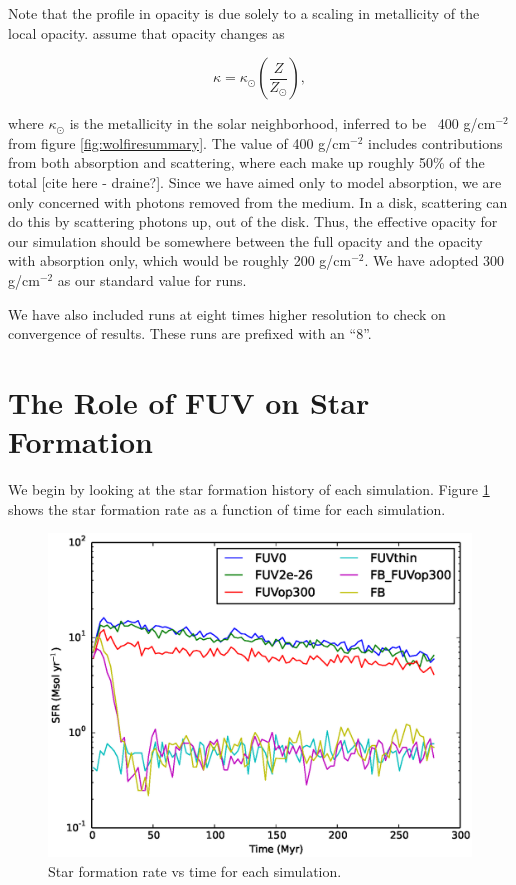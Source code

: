 Note that the profile in opacity is due solely to a scaling in metallicity of the local opacity. \citet{wolfireEt03} assume that opacity changes as

\begin{equation}
\kappa = \kappa_{\odot}\left(\frac{Z}{Z_{\odot}}\right),
\end{equation}

\noindent
where $\kappa_{\odot}$ is the metallicity in the solar neighborhood, inferred to be ~400 g/cm$^{-2}$ from figure \ref{fig:wolfiresummary}. The value of 400 g/cm$^{-2}$ includes contributions from both absorption and scattering, where each make up roughly 50\% of the total [cite here - draine?]. Since we have aimed only to model absorption, we are only concerned with photons removed from the medium. In a disk, scattering can do this by scattering photons up, out of the disk. Thus, the effective opacity for our simulation should be somewhere between the full opacity and the opacity with absorption only, which would be roughly 200 g/cm$^{-2}$. We have adopted 300 g/cm$^{-2}$ as our standard value for runs.

We have also included runs at eight times higher resolution to check on convergence of results. These runs are prefixed with an ``8''.

\section{The Role of FUV on Star Formation}
\label{sec:fuvsfr}

We begin by looking at the star formation history of each simulation. Figure \ref{fig:sfrvtime} shows the star formation rate as a function of time for each simulation. 

\begin{figure}
\includegraphics[width=\textwidth]{graphics/sfrvtime.eps}
\caption[Star formation histories.]{Star formation rate vs time for each simulation.}
\label{fig:sfrvtime}
\end{figure}

